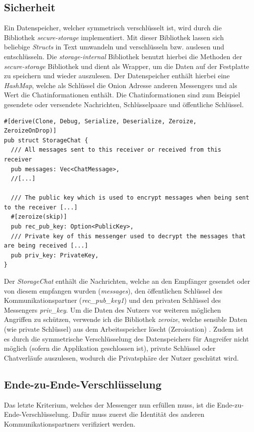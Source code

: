 \documentclass[a4paper,ngerman, headheight=28pt,12pt]{scrartcl}
\newcommand{\vcite}[1]{\cite[vgl.][]{#1}}
\begin{document}
\subsection{Sicherheit}
Ein Datenspeicher, welcher symmetrisch verschlüsselt ist, wird durch die Bibliothek \textit{secure-storage} implementiert. Mit dieser Bibliothek lassen sich beliebige \textit{Structs} in Text umwandeln und verschlüsseln bzw. auslesen und entschlüsseln. Die \textit{storage-internal} Bibliothek benutzt hierbei die Methoden der \textit{secure-storage} Bibliothek und dient als Wrapper, um die Daten auf der Festplatte zu speichern und wieder auszulesen. Der Datenspeicher enthält hierbei eine \textit{HashMap}, welche als Schlüssel die Onion Adresse anderen Messengers und als Wert die Chatinformationen enthält. Die Chatinformationen sind zum Beispiel gesendete oder versendete Nachrichten, Schlüsselpaare und öffentliche Schlüssel.
\begin{verbatim}
#[derive(Clone, Debug, Serialize, Deserialize, Zeroize, ZeroizeOnDrop)]
pub struct StorageChat {
  /// All messages sent to this receiver or received from this receiver
  pub messages: Vec<ChatMessage>,
  //[...]

  /// The public key which is used to encrypt messages when being sent to the receiver [...]
  #[zeroize(skip)]
  pub rec_pub_key: Option<PublicKey>,
  /// Private key of this messenger used to decrypt the messages that are being received [...]
  pub priv_key: PrivateKey,
}
\end{verbatim}
Der \textit{StorageChat} enthält die Nachrichten, welche an den Empfänger gesendet oder von diesem empfangen wurden (\textit{messages}), den öffentlichen Schlüssel des Kommunikationspartner (\textit{rec\_pub\_key1}) und den privaten Schlüssel des Messengers \textit{priv\_key}.
Um die Daten des Nutzers vor weiteren möglichen Angriffen zu schützen, verwende ich die Bibliothek \textit{zeroize}, welche sensible Daten (wie private Schlüssel) aus dem Arbeitsspeicher löscht (Zeroisation) \vcite{Zeroization}. Zudem ist es durch die symmetrische Verschlüsselung des Datenspeichers für Angreifer nicht möglich (sofern die Applikation geschlossen ist), private Schlüssel oder Chatverläufe auszulesen, wodurch die Privatsphäre der Nutzer geschützt wird.

\subsection{Ende-zu-Ende-Verschlüsselung}
Das letzte Kriterium, welches der Messenger nun erfüllen muss, ist die Ende-zu-Ende-Verschlüsselung. Dafür muss zuerst die Identität des anderen Kommunikationspartners verifiziert werden.
\end{document}

